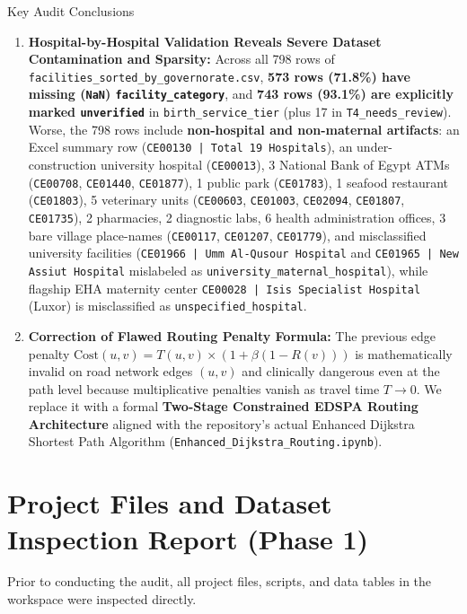 \documentclass[10pt,a4paper]{article}
\begin{document}
\begin{correctionbox}{Key Audit Conclusions}
\begin{enumerate}
    \item \textbf{Hospital-by-Hospital Validation Reveals Severe Dataset Contamination and Sparsity:} Across all 798 rows of \texttt{facilities\_sorted\_by\_governorate.csv}, \textbf{573 rows (71.8\%) have missing (\texttt{NaN}) \texttt{facility\_category}}, and \textbf{743 rows (93.1\%) are explicitly marked \texttt{unverified}} in \texttt{birth\_service\_tier} (plus 17 in \texttt{T4\_needs\_review}). Worse, the 798 rows include \textbf{non-hospital and non-maternal artifacts}: an Excel summary row (\texttt{CE00130 | Total 19 Hospitals}), an under-construction university hospital (\texttt{CE00013}), 3 National Bank of Egypt ATMs (\texttt{CE00708}, \texttt{CE01440}, \texttt{CE01877}), 1 public park (\texttt{CE01783}), 1 seafood restaurant (\texttt{CE01803}), 5 veterinary units (\texttt{CE00603}, \texttt{CE01003}, \texttt{CE02094}, \texttt{CE01807}, \texttt{CE01735}), 2 pharmacies, 2 diagnostic labs, 6 health administration offices, 3 bare village place-names (\texttt{CE00117}, \texttt{CE01207}, \texttt{CE01779}), and misclassified university facilities (\texttt{CE01966 | Umm Al-Qusour Hospital} and \texttt{CE01965 | New Assiut Hospital} mislabeled as \texttt{university\_maternal\_hospital}), while flagship EHA maternity center \texttt{CE00028 | Isis Specialist Hospital} (Luxor) is misclassified as \texttt{unspecified\_hospital}.
    \item \textbf{Correction of Flawed Routing Penalty Formula:} The previous edge penalty $\text{Cost}(u, v) = T(u, v) \times (1 + \beta(1 - R(v)))$ is mathematically invalid on road network edges $(u, v)$ and clinically dangerous even at the path level because multiplicative penalties vanish as travel time $T \to 0$. We replace it with a formal \textbf{Two-Stage Constrained EDSPA Routing Architecture} aligned with the repository's actual Enhanced Dijkstra Shortest Path Algorithm (\texttt{Enhanced\_Dijkstra\_Routing.ipynb}).
\end{enumerate}
\end{correctionbox}

\section{Project Files and Dataset Inspection Report (Phase 1)}

Prior to conducting the audit, all project files, scripts, and data tables in the workspace were inspected directly.
\end{document}
